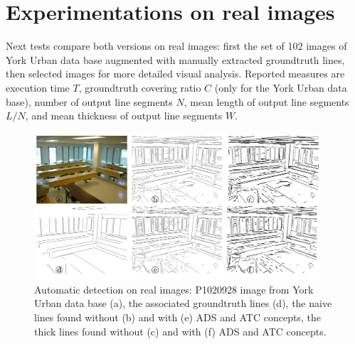 \documentclass[11pt]{article}
\begin{document}
\section{Experimentations on real images}
Next tests compare both versions on real images: first the set of 102
images of York Urban data base \cite{Denis08} augmented with manually extracted
groundtruth lines, then selected images for more detailed visual
analysis. Reported measures are execution time $T$, groundtruth covering
ratio $C$ (only for the York Urban data base), number of output line
segments $N$, mean length of output line segments $L/N$, and mean
thickness of output line segments $W$.
\pagebreak
\begin{figure}
  \begin{center}
  \includegraphics[width=0.95\textwidth]{Images/expe0.png}
  \end{center}
  \caption{Automatic detection on real images: P1020928 image from
    York Urban data base \cite{Denis08} (a), the associated groundtruth lines
    (d), the naive lines found without (b) and with (e) ADS and ATC
    concepts, the thick lines found without (c) and with (f) ADS and
    ATC concepts.}
\end{figure}
\end{document}
